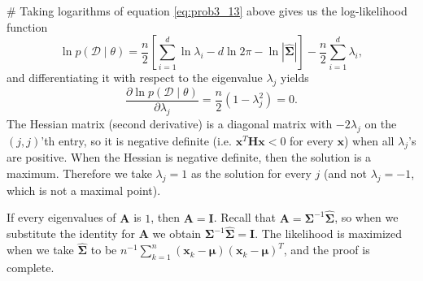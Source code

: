 \documentclass[12pt, a4paper]{article}
\newcommand{\D}{\mathcal{D}}
\newcommand{\vect}[1]{\bm{#1}}
\begin{document}
\begin{easylist}[enumerate]
# Taking logarithms of equation \eqref{eq:prob3_13} above gives us the log-likelihood function
\begin{equation*}
	\ln p(\D  \mid  \theta) = \frac{n}{2} \left[ \sum_{i=1}^{d} \ln \lambda_i - d \ln 2 \pi - \ln | \hat{\vect{\Sigma}} |  \right] - \frac{n}{2} \sum_{i=1}^{d} \lambda_i,
\end{equation*}
and differentiating it with respect to the eigenvalue $\lambda_j$ yields 
\begin{equation*}
	\frac{\partial \ln p(\D  \mid  \theta)}{\partial \lambda_j} = \frac{n}{2} \left(1 - \lambda_j^2 \right) = 0.
\end{equation*}
The Hessian matrix (second derivative) is a diagonal matrix with $-2\lambda_j$ on the $(j, j)$'th entry, so it is negative definite (i.e. $\vect{x}^T \vect{H} \vect{x} < 0$ for every $\vect{x}$) when all $\lambda_j$'s are positive.
When the Hessian is negative definite, then the solution is a maximum.
Therefore we take $\lambda_j = 1$ as the solution for every $j$ (and not $\lambda_j = -1$, which is not a maximal point).

If every eigenvalues of $\vect{A}$ is $1$, then $\vect{A} = \vect{I}$.
Recall that $\vect{A} = \vect{\Sigma}^{-1} \hat{\vect{\Sigma}}$, so when we substitute the identity for $\vect{A}$ we obtain $\vect{\Sigma}^{-1} \hat{\vect{\Sigma}} = \vect{I}$.
The likelihood is maximized when we take $\hat{\vect{\Sigma}}$ to be $ n^{-1} \sum_{k=1}^{n} \left( \vect{x}_k - \vect{\mu} \right) \left( \vect{x}_k - \vect{\mu} \right)^T$, and the proof is complete.
\end{easylist}
\end{document}
